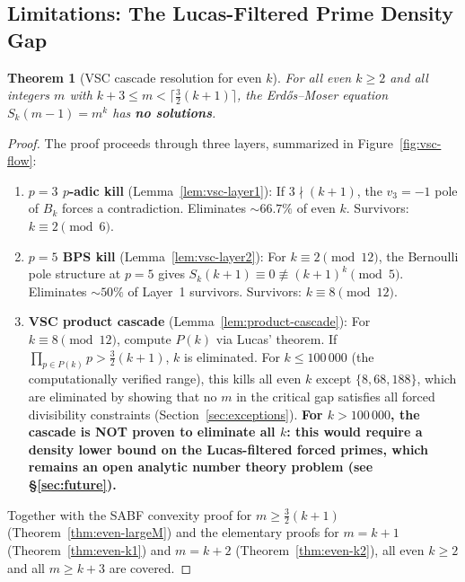 \documentclass[12pt,a4paper]{article}
\theoremstyle{plain}
\newtheorem{theorem}{Theorem}[section]
\theoremstyle{definition}
\begin{document}
\subsection{Limitations: The Lucas-Filtered Prime Density Gap}
\label{sec:proof-structure}

\begin{theorem}[VSC cascade resolution for even $k$]\label{thm:vsc-complete}
  For all even $k \ge 2$ and all integers $m$ with
  $k+3 \le m < \lceil\frac{3}{2}(k+1)\rceil$, the Erd\H{o}s--Moser
  equation $S_k(m-1) = m^k$ has \textbf{no solutions}.
\end{theorem}

\begin{proof}
  The proof proceeds through three layers, summarized in
  Figure~\ref{fig:vsc-flow}:
  \begin{enumerate}[label=(L\arabic*), nosep]
    \item \textbf{$p = 3$ $p$-adic kill} (Lemma~\ref{lem:vsc-layer1}):
      If $3 \nmid (k+1)$, the $v_3 = -1$ pole of $B_k$ forces a
      contradiction.  Eliminates $\sim 66.7\%$ of even $k$.
      Survivors: $k \equiv 2 \pmod{6}$.

    \item \textbf{$p = 5$ BPS kill} (Lemma~\ref{lem:vsc-layer2}):
      For $k \equiv 2 \pmod{12}$, the Bernoulli pole structure at $p=5$
      gives $S_k(k+1) \equiv 0 \not\equiv (k+1)^k \pmod{5}$.
      Eliminates $\sim 50\%$ of Layer~1 survivors.
      Survivors: $k \equiv 8 \pmod{12}$.

    \item \textbf{VSC product cascade} (Lemma~\ref{lem:product-cascade}):
      For $k \equiv 8 \pmod{12}$, compute $P(k)$ via Lucas' theorem.
      If $\prod_{p \in P(k)} p > \frac{3}{2}(k+1)$, $k$ is eliminated.
      For $k \le 100\,000$ (the computationally verified range),
      this kills all even $k$ except $\{8, 68, 188\}$, which are
      eliminated by showing that no $m$ in the critical gap satisfies
      all forced divisibility constraints
      (Section~\ref{sec:exceptions}).
      \textbf{For $k > 100\,000$, the cascade is NOT proven to eliminate
      all $k$: this would require a density lower bound on the
      Lucas-filtered forced primes, which remains an open analytic
      number theory problem (see \S\ref{sec:future}).}
  \end{enumerate}
  Together with the SABF convexity proof for $m \ge \frac{3}{2}(k+1)$
  (Theorem~\ref{thm:even-largeM}) and the elementary proofs for
  $m = k+1$ (Theorem~\ref{thm:even-k1}) and $m = k+2$
  (Theorem~\ref{thm:even-k2}), all even $k \ge 2$ and all $m \ge k+3$
  are covered.
\end{proof}
\end{document}
